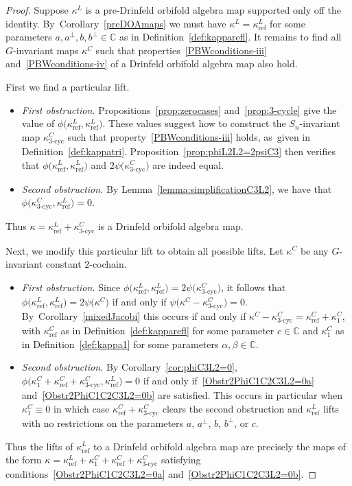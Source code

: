\documentclass[10pt,a4paper]{amsart}
\numberwithin{equation}{section}
\DeclareMathOperator{\refl}{ref}
\DeclareMathOperator{\tri}{3-cyc}
\begin{document}
\begin{proof}
Suppose $\kappa^L$ is a pre-Drinfeld orbifold algebra map supported only off
the identity. By~Corollary~\ref{preDOAmaps} we must have $\kappa^L=\kappa^L_{\refl}$
for some parameters $a,a^\perp,b,b^\perp \in \mathbb{C}$ as in Definition~\ref{def:kapparefl}.
It remains to find all $G$-invariant maps $\kappa^C$ such that
properties~\eqref{PBWconditions-iii} and~\eqref{PBWconditions-iv}
of a Drinfeld orbifold algebra map also hold.

First we find a particular lift.
\begin{itemize}\itemsep=0pt
	\item {\it First obstruction.} Propositions~\ref{prop:zerocases} and~\ref{prop:3-cycle} give the value
	of $\phi\big(\kappa^L_{\refl},\kappa^L_{\refl}\big)$. These values sug\-gest how to construct
	the $S_n$-invariant map $\kappa^C_{\tri}$ such that property~\eqref{PBWconditions-iii}
	holds, as~given in Definition~\ref{def:kappatri}. Proposition~\ref{prop:phiL2L2=2psiC3}
	then verifies that $\phi\big(\kappa^L_{\refl},\kappa^L_{\refl}\big)$ and
	$2\psi\big(\kappa^C_{\tri}\big)$ are indeed equal.
	\item {\it Second obstruction.} By Lemma~\ref{lemma:simplificationC3L2}, we have
	that $\phi\big(\kappa^C_{\tri},\kappa^L_{\refl}\big)=0$.
\end{itemize}
	Thus $\kappa=\kappa^L_{\refl}+\kappa^C_{\tri}$ is 	a Drinfeld orbifold algebra map.

Next, we modify this particular lift to obtain all possible lifts.
Let $\kappa^C$ be any $G$-invariant constant $2$-cochain.
\begin{itemize}\itemsep=0pt
 \item {\it First obstruction. } Since $\phi\big(\kappa^L_{\refl},\kappa^L_{\refl})=2\psi(\kappa^C_{\tri}\big)$,
 it follows that $\phi\big(\kappa^L_{\refl},\kappa^L_{\refl}\big)=2\psi\big(\kappa^C\big)$
 if and only if $\psi\big(\kappa^C-\kappa^C_{\tri}\big)=0$. By~Corollary~\ref{mixedJacobi} this occurs
 if and only if $\kappa^C-\kappa^C_{\tri}=\kappa^C_{\refl}+\kappa^C_1$, with $\kappa^C_{\refl}$
 as in Definition~\ref{def:kapparefl} for some parameter $c\in\mathbb{C}$ and $\kappa^C_1$
 as in Definition~\ref{def:kappa1} for some parameters $\alpha,\beta\in\mathbb{C}$.
 \item {\it Second obstruction. }
 By Corollary~\ref{cor:phiC3L2=0},
 $\phi\big(\kappa^C_1+\kappa^C_{\refl}+\kappa^C_{\tri},\kappa^L_{\refl}\big)=0$
 if and only if~\eqref{Obstr2PhiC1C2C3L2=0a} and~\eqref{Obstr2PhiC1C2C3L2=0b} are satisfied.
 This occurs in particular when $\kappa^C_1 \equiv 0$ in which case
 $\kappa^C_{\refl}+\kappa^C_{\tri}$ clears the second obstruction and
 $\kappa^L_{\refl}$ lifts with no restrictions on the parameters $a$,
 $a^\perp$, $b$, $b^\perp$, or $c$.
 \end{itemize}
 Thus the lifts of $\kappa^L_{\refl}$ to a Drinfeld orbifold algebra map are
 precisely the maps of the form
 $\kappa=\kappa^L_{\refl}+\kappa^C_1+\kappa^C_{\refl}+\kappa^C_{\tri}$ satisfying
 conditions~\eqref{Obstr2PhiC1C2C3L2=0a} and~\eqref{Obstr2PhiC1C2C3L2=0b}.
\end{proof}
\end{document}
